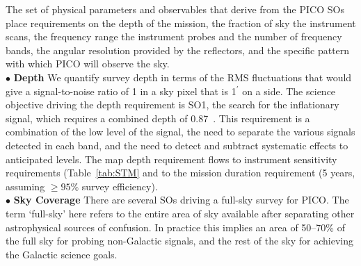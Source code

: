 \documentclass[PICOReport.tex]{subfiles}
\begin{document}
The set of physical parameters and observables that derive from the PICO \ac{SOs} place 
requirements on the depth of the mission, the fraction of sky the instrument scans, the frequency range the 
instrument probes and the number of frequency bands, the angular resolution provided by the reflectors, and
the specific pattern with which PICO will observe the sky.  \\
%
$\bullet$ {\bf Depth} \hspace{0.1in} We quantify survey depth in terms of the RMS fluctuations that would give
a signal-to-noise ratio of 1 in a sky pixel that is 1$^\prime$ on a side.  The science objective driving 
the depth requirement is SO1, the search for the inflationary signal, which 
requires a combined depth of 0.87~\microkamin. This requirement is a combination of the low level of the signal, the need
to separate the various signals detected in each band, and the need to detect and subtract systematic effects 
to anticipated levels.  The map depth requirement flows to instrument sensitivity requirements (Table~\ref{tab:STM} and to the mission duration requirement (5 years, assuming $\ge 95\%$ survey efficiency). \\
%
$\bullet$ {\bf Sky Coverage} \hspace{0.1in} There are several \ac{SOs} driving a full-sky survey for PICO. The 
term `full-sky' here refers to the entire area of sky available after separating other astrophysical sources of confusion. In 
practice this implies an area of 50--70\% of the full sky for probing non-Galactic signals, and the rest of the sky
for achieving the Galactic science goals. 
\end{document}
